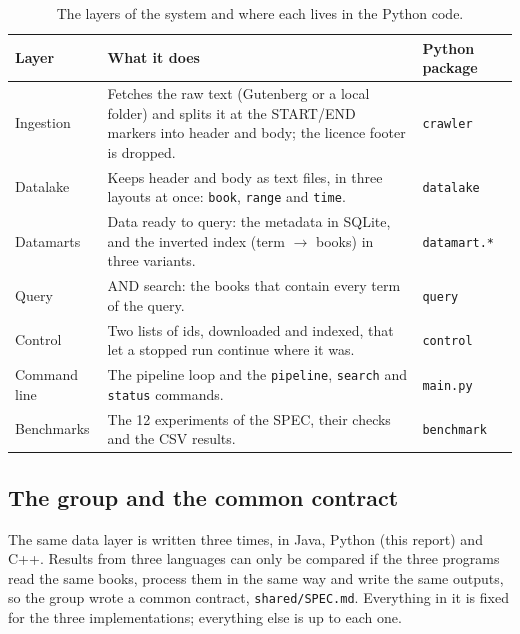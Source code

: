 \documentclass[11pt,a4paper]{article}
\newcommand{\code}[1]{\texttt{#1}}
\begin{document}
\begin{table}[H]
\centering\small
\begin{tabularx}{\linewidth}{@{}l Y l@{}}
\toprule
Layer & What it does & Python package \\
\midrule
Ingestion & Fetches the raw text (Gutenberg or a local folder) and splits it at the START/END markers into header and body; the licence footer is dropped. & \code{crawler} \\
Datalake & Keeps header and body as text files, in three layouts at once: \code{book}, \code{range} and \code{time}. & \code{datalake} \\
Datamarts & Data ready to query: the metadata in SQLite, and the inverted index (term $\rightarrow$ books) in three variants. & \code{datamart.*} \\
Query & AND search: the books that contain every term of the query. & \code{query} \\
Control & Two lists of ids, downloaded and indexed, that let a stopped run continue where it was. & \code{control} \\
Command line & The pipeline loop and the \code{pipeline}, \code{search} and \code{status} commands. & \code{main.py} \\
Benchmarks & The 12 experiments of the SPEC, their checks and the CSV results. & \code{benchmark} \\
\bottomrule
\end{tabularx}
\caption{The layers of the system and where each lives in the Python code.}
\end{table}

\subsection{The group and the common contract}
The same data layer is written three times, in Java, Python (this report) and C++. Results from
three languages can only be compared if the three programs read the same books, process them in
the same way and write the same outputs, so the group wrote a common contract,
\code{shared/SPEC.md}. Everything in it is fixed for the three implementations; everything else is
up to each one.
\end{document}
